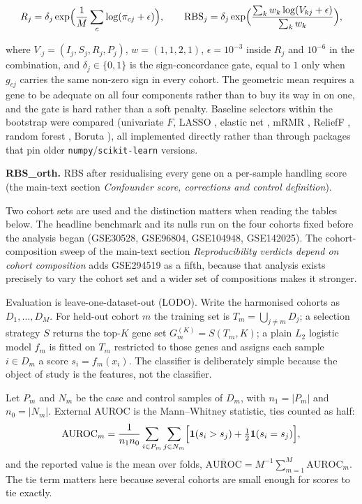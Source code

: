 \documentclass[11pt]{article}
\begin{document}
\begin{equation}
R_j = \delta_j \exp\Bigl( \frac{1}{M} \sum_{c} \log (\pi_{cj} + \epsilon) \Bigr) , \qquad
\mathrm{RBS}_j = \delta_j \exp\Bigl( \frac{\sum_k w_k \log (V_{kj} + \epsilon)}{\sum_k w_k} \Bigr) ,
\label{eq:rbs}
\end{equation}

where $V_{\cdot j} = (I_j, S_j, R_j, P_j)$, $w = (1, 1, 2, 1)$, $\epsilon = 10^{-3}$ inside $R_j$ and $10^{-6}$ in the combination, and $\delta_j \in \{0, 1\}$ is the
sign-concordance gate, equal to $1$ only when $g_{cj}$ carries the same non-zero sign in every
cohort. The geometric mean requires a gene to be adequate on all four components rather
than to buy its way in on one, and the gate is hard rather than a soft penalty. Baseline selectors within the bootstrap were compared (univariate
$F$, LASSO \cite{tibshirani1996}, elastic net \cite{zou2005}, mRMR \cite{peng2005}, ReliefF \cite{kononenko1994}, random forest \cite{breiman2001}, Boruta \cite{kursa2010}), all implemented directly rather
than through packages that pin older \texttt{numpy}/\texttt{scikit-learn} versions.

\textbf{RBS\_orth.} RBS after residualising every gene on a per-sample handling score
(the main-text section \textit{Confounder score, corrections and control definition}).

Two cohort sets are used and the distinction matters when reading the tables below. The headline
benchmark and its nulls run on the four cohorts fixed before the analysis began (GSE30528,
GSE96804, GSE104948, GSE142025). The cohort-composition sweep of the main-text section \textit{Reproducibility verdicts depend on cohort composition}
adds GSE294519 as a fifth, because that analysis exists precisely to vary the cohort set and
a wider set of compositions makes it stronger.

Evaluation is leave-one-dataset-out (LODO). Write the harmonised cohorts as $D_1,\dots,D_M$. For held-out cohort $m$ the training set is $T_m = \bigcup_{j \neq m} D_j$; a selection strategy $S$ returns the top-$K$ gene set $G_m^{(K)} = S(T_m,K)$; a plain $L_2$ logistic model $f_m$ is fitted on $T_m$ restricted to those genes and assigns each sample $i \in D_m$ a score $s_i = f_m(x_i)$. The classifier is deliberately simple because the object of study is the features, not the classifier.

Let $P_m$ and $N_m$ be the case and control samples of $D_m$, with $n_1 = |P_m|$ and $n_0 = |N_m|$. External AUROC is the Mann--Whitney statistic, ties counted as half:
\begin{equation}
\mathrm{AUROC}_m = \frac{1}{n_1 n_0}
\sum_{i \in P_m} \sum_{j \in N_m}
\Bigl[ \mathbf{1}(s_i > s_j) + \tfrac{1}{2}\mathbf{1}(s_i = s_j) \Bigr] ,
\label{eq:auroc}
\end{equation}
and the reported value is the mean over folds, $\overline{\mathrm{AUROC}} = M^{-1}\sum_{m=1}^{M} \mathrm{AUROC}_m$. The tie term matters here because several cohorts are small enough for scores to tie exactly.
\end{document}
